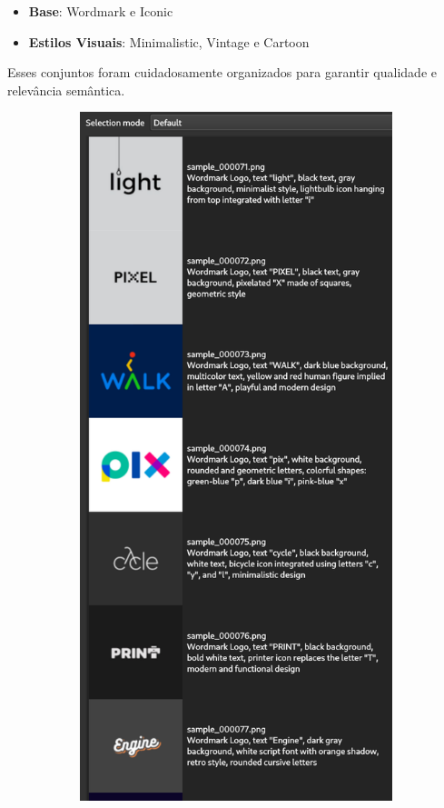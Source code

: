 \documentclass[12pt, %
openright, 
oneside, %
a4paper,    %
brazil]{facom-ufu-abntex2}
\begin{document}
\begin{itemize}
    \item \textbf{Base}: Wordmark e Iconic
    \item \textbf{Estilos Visuais}: Minimalistic, Vintage e Cartoon
\end{itemize}

Esses conjuntos foram cuidadosamente organizados para garantir qualidade e relevância semântica.

\begin{figure}[H]
    \centering
    \begin{subfigure}{0.2\textwidth}
      \centering
      \includegraphics[width=\linewidth]{wordmark.png}

\end{subfigure}
\end{figure}
\end{document}
